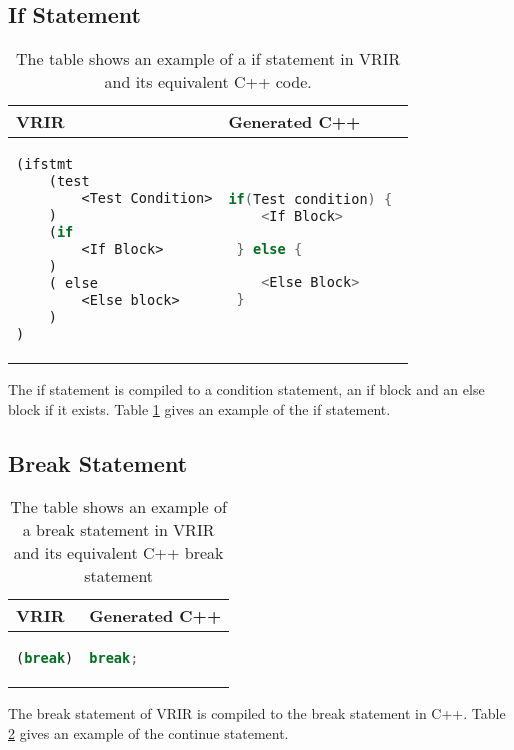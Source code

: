 \subsection{If Statement}
\begin{table}[htbp]
\centering
\begin{tabular}{|l|l|}
\hline

VRIR &  Generated C++ \\
\hline
{
\begin{lstlisting}[language=lisp,frame=none, numbers=none]
(ifstmt
	(test
		<Test Condition>
	)
	(if
		<If Block>
	)	
	( else 
		<Else block>
	)
)
\end{lstlisting}
}
&
{
\begin{lstlisting}[language=c,frame=none, numbers=none]
 if(Test condition) { 
	<If Block>

 } else {

	<Else Block>
 }
\end{lstlisting}
} \\
\hline
\end{tabular}
\caption[If Statement Example]{The table shows an example of a if statement in VRIR and its equivalent C++ code.}
\label{tab:ifStmt}
\end{table}
The if statement is compiled to a condition statement, an if block and an else block if it exists.  Table \ref{tab:ifStmt} gives an example of the if statement.
\subsection{Break Statement}
\begin{table}[htbp]
\centering
\begin{tabular}{|l|l|}
\hline

VRIR &  Generated C++ \\
\hline
{
\begin{lstlisting}[language=lisp,frame=none, numbers=none]
(break)
\end{lstlisting}
}
&
{
\begin{lstlisting}[language=c,frame=none, numbers=none]
break;
\end{lstlisting}
} \\
\hline
\end{tabular}
\caption[Break statement example]{The table shows an example of a break statement in VRIR and its equivalent C++ break statement}
\label{tab:breakStmt}
\end{table}
The break statement of VRIR is compiled to the break statement in C++. Table \ref{tab:breakStmt} gives an example of the continue statement.
